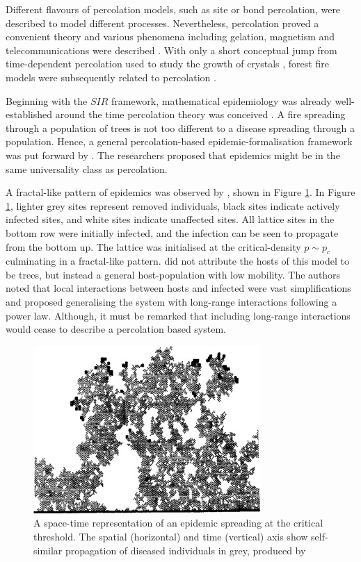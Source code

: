 Different flavours of percolation models, such as site or bond percolation, were described
to model different processes. Nevertheless, percolation proved a convenient theory and various phenomena including gelation, 
magnetism and telecommunications were described \cite{trove.nla.gov.au/work/26493727}. 
With only a short conceptual jump from time-dependent percolation used to study the growth of crystals \cite{Family_1985},
forest fire models were subsequently related to percolation \cite{MacKay_1984}.

Beginning with the $SIR$ framework, mathematical epidemiology was already well-established
around the time percolation theory was conceived \cite{baily1975mathematical}. 
A fire spreading through a population of trees is not too different to a disease spreading through 
a population. Hence, a general percolation-based epidemic-formalisation framework was put forward by
\cite{pub.1059067807}. The researchers proposed that epidemics might be in the same universality class
as percolation.

A fractal-like pattern of epidemics was observed by \cite{GRASSBERGER1986273}, shown in Figure \ref{fig:1d_perc_basis}. 
In Figure \ref{fig:1d_perc_basis}, lighter grey sites represent removed individuals, 
black sites indicate actively infected sites, and white sites indicate unaffected sites. 
All lattice sites in the bottom row were initially infected, and the infection can be seen to propagate
from the bottom up. The lattice was initialised at the critical-density $p\sim p_c$ culminating in a fractal-like pattern.
\cite{GRASSBERGER1986273} did not attribute the hosts of this model to be trees, but instead a general host-population with low mobility. 
The authors noted that local interactions between hosts and infected were vast simplifications and proposed 
generalising the system with long-range interactions following a power law. 
Although, it must be remarked that including long-range interactions would cease to describe a percolation based system.

\begin{figure}
    \centering
    \includegraphics{chapter2/figures/perc1.jpg}
    \caption{A space-time representation of an epidemic spreading at the critical threshold. 
    The spatial (horizontal) and time (vertical) axis show self-similar propagation of diseased 
    individuals in grey, produced by \cite{GRASSBERGER1986273}}
    \label{fig:1d_perc_basis}
\end{figure}

